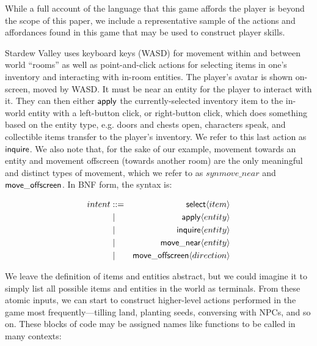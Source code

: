 While a full account of the language that this game affords the player is
beyond the scope of this paper, we include a representative sample of the
actions and affordances found in this game that may be used to construct
player skills.

Stardew Valley uses keyboard keys (WASD) for movement within and between
world ``rooms'' as well as point-and-click actions for selecting items in
one's inventory and interacting with in-room entities. The player's avatar
is shown on-screen, moved by WASD. It must be near an entity for the player
to interact with it. They can then either $\mathsf{apply}$ the
currently-selected inventory item to the in-world entity with a left-button
click, or right-button click, which does something based on the entity
type, e.g. doors and chests open, characters speak, and collectible items
transfer to the player's inventory. We refer to this last action as
$\mathsf{inquire}$. We also note that, for the sake of our example, 
movement towards an entity and movement offscreen (towards another room)
are the only meaningful and distinct types of movement, which we refer to
as $syn{move\_near}$ and $\mathsf{move\_offscreen}$. In BNF form, the syntax
is:


\begin{eqnarray*}
intent &::=& \mathsf{select} \langle item \rangle\\
       &\mid& \mathsf{apply} \langle entity \rangle\\
       &\mid& \mathsf{inquire} \langle entity \rangle\\
       &\mid& \mathsf{move\_near} \langle entity \rangle\\
       &\mid& \mathsf{move\_offscreen} \langle direction \rangle
\end{eqnarray*}

We leave the definition of items and entities abstract, but we could
imagine it to simply list all possible items and entities in the world as
terminals.
From these atomic inputs, we can start to construct higher-level actions
performed in the game most frequently---tilling land,
planting seeds, conversing with NPCs, and so on. These blocks of code may
be assigned names like functions to be called in many contexts:

% 

